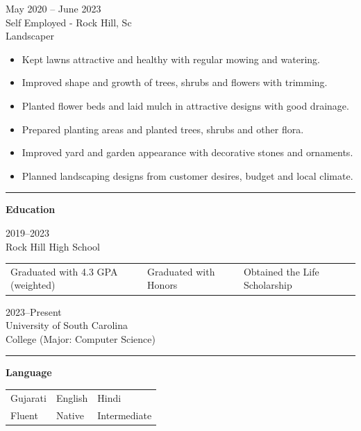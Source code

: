 \documentclass[11pt, letterpaper]{article}
\begin{document}
\vspace{6pt}
May 2020 -- June 2023\\
Self Employed - Rock Hill, Sc\\
Landscaper
\begin{itemize}[leftmargin=1.5em, itemsep=1pt, topsep=2pt]
  \item Kept lawns attractive and healthy with regular mowing and watering.
  \item Improved shape and growth of trees, shrubs and flowers with trimming.
  \item Planted flower beds and laid mulch in attractive designs with good drainage.
  \item Prepared planting areas and planted trees, shrubs and other flora.
  \item Improved yard and garden appearance with decorative stones and ornaments.
  \item Planned landscaping designs from customer desires, budget and local climate.
\end{itemize}

\vspace{4pt}
\hrule
\vspace{4pt}

\textbf{\large Education}

\vspace{4pt}
2019--2023\\
Rock Hill High School\\
\begin{tabularx}{\textwidth}{X X X}
  Graduated with 4.3 GPA (weighted) & Graduated with Honors & Obtained the Life Scholarship
\end{tabularx}

\vspace{4pt}
2023--Present\\
University of South Carolina\\
College (Major: Computer Science)

\vspace{4pt}
\hrule
\vspace{4pt}

\textbf{\large Language}

\vspace{4pt}
\begin{tabularx}{\textwidth}{X X X}
  Gujarati & English & Hindi \\[6pt]
  Fluent   & Native  & Intermediate
\end{tabularx}
\end{document}
